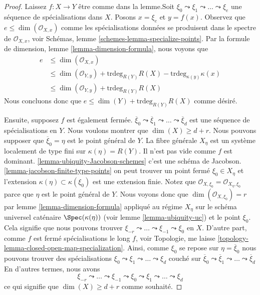 \begin{proof}
Laissez $f : X \to Y$ être comme dans la lemme.Soit $\xi_0 \leadsto \xi_1 \leadsto \ldots \leadsto \xi_e$ une séquence de spécialisations dans $X$. Posons $x = \xi_e$ et $y = f(x)$. Observez que $e \leq \dim(\mathcal{O}_{X, x})$ comme les spécialisations données se produisent dans le spectre de $\mathcal{O}_{X, x}$, voir Schémas, lemme \ref{schemes-lemma-specialize-points}. Par la formule de dimension, lemme \ref{lemma-dimension-formula}, nous voyons que
\begin{align*}
e & \leq \dim(\mathcal{O}_{X, x}) \\
& \leq \dim(\mathcal{O}_{Y, y}) +
\text{trdeg}_{R(Y)} R(X) - \text{trdeg}_{\kappa(y)} \kappa(x) \\
& \leq \dim(\mathcal{O}_{Y, y}) + \text{trdeg}_{R(Y)} R(X)
\end{align*}
Nous concluons donc que $e \leq \dim(Y) + \text{trdeg}_{R(Y)} R(X)$ comme désiré.

\medskip\noindent

Ensuite, supposez $f$ est également fermée. $\overline{\xi}_0 \leadsto \overline{\xi}_1 \leadsto \ldots
\leadsto \overline{\xi}_d$ est une séquence de spécialisations en $Y$. Nous voulons montrer que $\dim(X) \geq d + r$. Nous pouvons supposer que $\overline{\xi}_0 = \eta$ est le point général de $Y$. La fibre générale $X_\eta$ est un système localement de type fini sur
$\kappa(\eta) = R(Y)$. Il n'est pas vide comme $f$ est dominant. \ref{lemma-ubiquity-Jacobson-schemes} c'est une schéma de Jacobson. \ref{lemma-jacobson-finite-type-points}
on peut trouver un point fermé $\xi_0 \in X_\eta$ et l'extension
$\kappa(\eta) \subset \kappa(\xi_0)$ est une extension finie. Notez que
$\mathcal{O}_{X, \xi_0} = \mathcal{O}_{X_\eta, \xi_0}$ parce que
$\eta$ est le point général de $Y$. Nous voyons donc que
$\dim(\mathcal{O}_{X, \xi_0}) = r$ par lemme \ref{lemma-dimension-formula}
appliqué au régime $X_\eta$ sur le schéma universel caténaire $\Spec(\kappa(\eta))$ (voir lemme \ref{lemma-ubiquity-uc}) et le point $\xi_0$. Cela signifie que nous pouvons trouver
$\xi_{-r} \leadsto \ldots \leadsto \xi_{-1} \leadsto \xi_0$
en $X$. D'autre part, comme $f$ est fermé spécialisations le long $f$, voir Topologie, me laisse \ref{topology-lemma-closed-open-map-specialization}. Ainsi, comme $\xi_0$ se repose sur $\eta = \overline{\xi}_0$ nous pouvons trouver des spécialisations $\xi_0 \leadsto \xi_1 \leadsto \ldots \leadsto \xi_d$
couché sur $\overline{\xi}_0 \leadsto \overline{\xi}_1 \leadsto \ldots
\leadsto \overline{\xi}_d$En d'autres termes, nous avons
$$
\xi_{-r} \leadsto \ldots \leadsto \xi_{-1} \leadsto \xi_0
\leadsto \xi_1 \leadsto \ldots \leadsto \xi_d
$$
ce qui signifie que $\dim(X) \geq d + r$ comme souhaité.

\end{proof}

